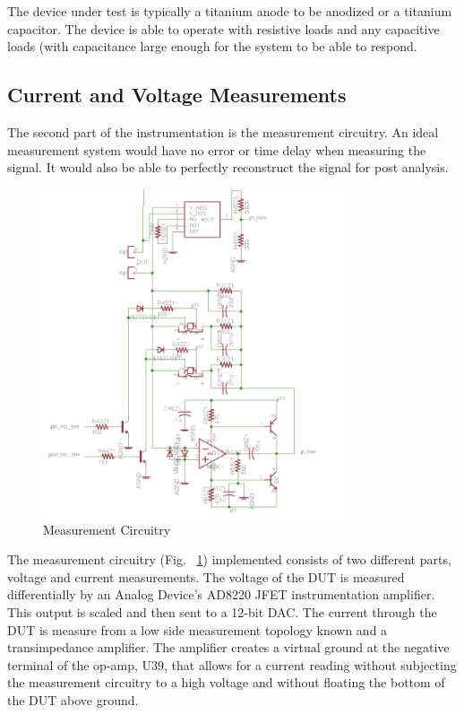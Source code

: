 \documentclass[journal]{IEEEtran}
\begin{document}
The device under test is typically a titanium anode to be anodized or a titanium capacitor. The device is able to operate with resistive loads and any capacitive loads (with capacitance large enough for the system to be able to respond.


\subsection{Current and Voltage Measurements}

The second part of the instrumentation is the measurement circuitry. An ideal measurement system would have no error or time delay when measuring the signal. It would also be able to perfectly reconstruct the signal for post analysis. 


\begin{figure}[here]
\centering
\includegraphics[width=3.5in]{measCir}
\caption{Measurement Circuitry}
\label{fig:measCir}
\end{figure}

The measurement circuitry (Fig. ~\ref{fig:measCir}) implemented consists of two different parts, voltage and current measurements. The voltage of the DUT is measured differentially by an Analog Device’s AD8220 JFET instrumentation amplifier. This output is scaled and then sent to a 12-bit DAC. The current through the DUT is measure from a low side measurement topology known and a transimpedance amplifier. The amplifier creates a virtual ground at the negative terminal of the op-amp, U39, that allows for a current reading without subjecting the measurement circuitry to a high voltage and without floating the bottom of the DUT above ground.
\end{document}
